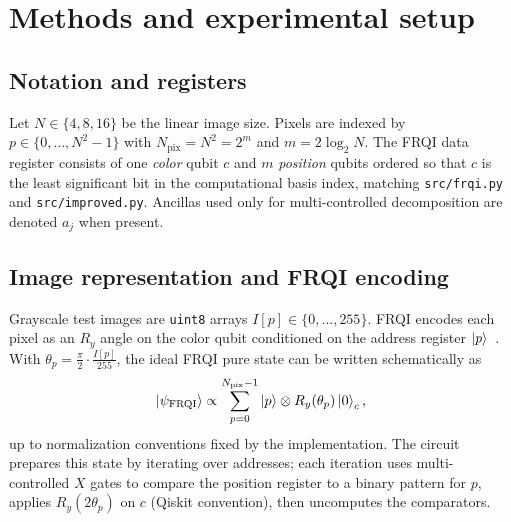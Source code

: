\chapter{Methods and experimental setup}\label{ch:methods}
\thispagestyle{pagestyle}

\graphicspath{{../../outputs/}{images/}{../../thesis/design/figures/}}

\section{Notation and registers}
Let $N\in\{4,8,16\}$ be the linear image size. Pixels are indexed by $p\in\{0,\ldots,N^2-1\}$ with $N_{\mathrm{pix}}=N^2=2^m$ and $m=2\log_2 N$. The FRQI data register consists of one \emph{color} qubit $c$ and $m$ \emph{position} qubits ordered so that $c$ is the least significant bit in the computational basis index, matching \texttt{src/frqi.py} and \texttt{src/improved.py}. Ancillas used only for multi-controlled decomposition are denoted $a_j$ when present.

\section{Image representation and FRQI encoding}
Grayscale test images are \texttt{uint8} arrays $I[p]\in\{0,\ldots,255\}$. FRQI encodes each pixel as an $R_y$ angle on the color qubit conditioned on the address register $\ket{p}$~\cite{Le2011FRQI}. With $\theta_p = \frac{\pi}{2}\cdot\frac{I[p]}{255}$, the ideal FRQI pure state can be written schematically as
\begin{equation}
\ket{\psi_{\mathrm{FRQI}}} \propto \sum_{p=0}^{N_{\mathrm{pix}}-1} \ket{p}\otimes R_y(\theta_p)\ket{0}_c ,
\end{equation}
up to normalization conventions fixed by the implementation. The circuit prepares this state by iterating over addresses; each iteration uses multi-controlled $X$ gates to compare the position register to a binary pattern for $p$, applies $R_y(2\theta_p)$ on $c$ (Qiskit convention), then uncomputes the comparators.

